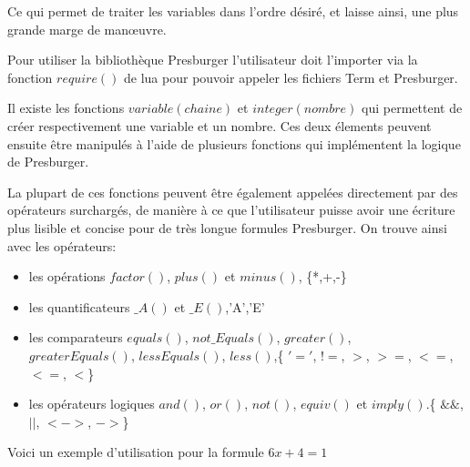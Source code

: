 
Ce qui permet de traiter les variables dans l'ordre désiré, et laisse ainsi, une plus grande marge de man\oe{}uvre.\\\par

Pour utiliser la bibliothèque Presburger l'utilisateur doit l'importer via la fonction $require()$ de lua pour pouvoir appeler les fichiers Term et Presburger.\\\par

Il existe les fonctions $variable(chaine)$ et $integer(nombre)$ qui permettent de créer respectivement une variable et un nombre. Ces deux élements peuvent ensuite être manipulés à l'aide de plusieurs fonctions qui implémentent la logique de Presburger.\\\par

La plupart de ces fonctions peuvent être également appelées directement par des opérateurs surchargés, de manière à ce que l'utilisateur puisse avoir une écriture plus lisible et concise pour de très longue formules Presburger. On trouve ainsi avec les opérateurs:
\begin{itemize}
 \item les opérations $factor()$, $plus()$ et $minus()$, \{*,+,-\}
 \item les quantificateurs $\_A()$ et $\_E()$,{'A','E'}
 \item les comparateurs $equals()$, $not\_Equals()$, $greater()$,\\$greaterEquals()$, $lessEquals()$, $less()$,\{ $'='$, $!=$, $>$, $>=$, $<=$, $<=$, $<$\}
 \item les opérateurs logiques $and()$, $or()$, $not()$, $equiv()$ et $imply()$.\{ $\&\&$, $||$, $<->$, $->$\}
\end{itemize}
Voici un exemple d'utilisation pour la formule $6x + 4 = 1$\\
 
